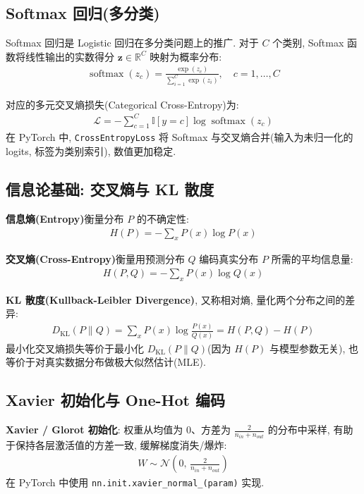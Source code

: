 \documentclass{../../nndlcourse}
\begin{document}
\subsection{Softmax 回归(多分类)}

Softmax 回归是 Logistic 回归在多分类问题上的推广. 对于 $C$ 个类别, Softmax 函数将线性输出的实数得分 $\boldsymbol{z}\in\mathbb{R}^C$ 映射为概率分布: 
\begin{align}
    \operatorname{softmax}(z_c) = \frac{\exp(z_c)}{\sum_{i=1}^C \exp(z_i)}, \quad c = 1, \ldots, C
\end{align}

对应的多元交叉熵损失(Categorical Cross-Entropy)为: 
\begin{align}
    \mathcal{L} = -\sum_{c=1}^C \mathbb{I}[y = c]\log\operatorname{softmax}(z_c)
\end{align}
在 PyTorch 中, \texttt{CrossEntropyLoss} 将 Softmax 与交叉熵合并(输入为未归一化的 logits, 标签为类别索引), 数值更加稳定.

\subsection{信息论基础: 交叉熵与 KL 散度}

\textbf{信息熵(Entropy)}衡量分布 $P$ 的不确定性: 
\begin{align}
    H(P) = -\sum_x P(x)\log P(x)
\end{align}

\textbf{交叉熵(Cross-Entropy)}衡量用预测分布 $Q$ 编码真实分布 $P$ 所需的平均信息量: 
\begin{align}
    H(P, Q) = -\sum_x P(x)\log Q(x)
\end{align}

\textbf{KL 散度(Kullback-Leibler Divergence)}, 又称相对熵, 量化两个分布之间的差异: 
\begin{align}
    D_{\mathrm{KL}}(P \| Q) = \sum_x P(x)\log\frac{P(x)}{Q(x)} = H(P, Q) - H(P)
\end{align}
最小化交叉熵损失等价于最小化 $D_{\mathrm{KL}}(P\|Q)$(因为 $H(P)$ 与模型参数无关), 也等价于对真实数据分布做极大似然估计(MLE).

\subsection{Xavier 初始化与 One-Hot 编码}

\textbf{Xavier / Glorot 初始化}: 权重从均值为 0、方差为 $\frac{2}{n_{in}+n_{out}}$ 的分布中采样, 有助于保持各层激活值的方差一致, 缓解梯度消失/爆炸: 
\begin{align}
    W \sim \mathcal{N}\!\left(0,\, \frac{2}{n_{in} + n_{out}}\right)
\end{align}
在 PyTorch 中使用 \texttt{nn.init.xavier\_normal\_(param)} 实现.
\end{document}
